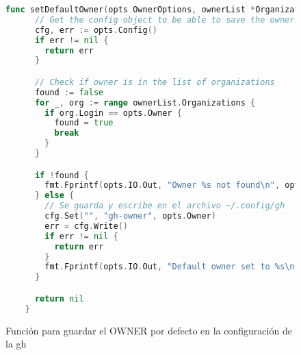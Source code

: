 \begin{figure}[H]
  \begin{lstlisting}[language=GO]
    func setDefaultOwner(opts OwnerOptions, ownerList *OrganizationList) error {
      // Get the config object to be able to save the owner
      cfg, err := opts.Config()
      if err != nil {
        return err
      }

      // Check if owner is in the list of organizations
      found := false
      for _, org := range ownerList.Organizations {
        if org.Login == opts.Owner {
          found = true
          break
        }
      }

      if !found {
        fmt.Fprintf(opts.IO.Out, "Owner %s not found\n", opts.Owner)
      } else {
        // Se guarda y escribe en el archivo ~/.config/gh
        cfg.Set("", "gh-owner", opts.Owner)
        err = cfg.Write()
        if err != nil {
          return err
        }
        fmt.Fprintf(opts.IO.Out, "Default owner set to %s\n", opts.Owner)
      }

      return nil
    }
  \end{lstlisting}
  \caption{Función para guardar el OWNER por defecto en la configuración de la gh}
  \label{fig:saveOwner}
\end{figure}

